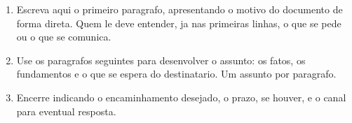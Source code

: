 %

\noindent \lkSalutation

\vspace{1em}

\begin{enumerate}
  \item Escreva aqui o primeiro paragrafo, apresentando o motivo do
  documento de forma direta. Quem le deve entender, ja nas primeiras
  linhas, o que se pede ou o que se comunica.

  \item Use os paragrafos seguintes para desenvolver o assunto: os fatos,
  os fundamentos e o que se espera do destinatario. Um assunto por
  paragrafo.

  \item Encerre indicando o encaminhamento desejado, o prazo, se houver, e
  o canal para eventual resposta.
\end{enumerate}

%
%
